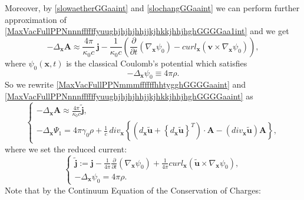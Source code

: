\documentclass{article}
\theoremstyle{definition}
\theoremstyle{remark}
\renewcommand{\vec}[1]{\mathbf{#1}}
\newcommand{\R}{\mathbb{R}}
\newcommand{\er}{\eqref}
\newcommand{\R}{{\mathbb{R}}}
\newcommand{\er}{\eqref}
\begin{document}
Moreover, by \er{slowaetherGGaaint} and \er{slochangGGaaint} we can
perform further approximation of
\er{MaxVacFullPPNnnnffffffyuughjhjhjhhjjkjhkkjhhjhghGGGGaa1int} and
we get
\begin{equation}\label{MaxVacFullPPNnnnffffffyuughjhjhjhhjjkjhkkjhhjhghGGGGaaint}
-\Delta_{\vec x}\vec A
\approx\frac{4\pi}{\kappa_0 c}\,\vec
j-\frac{1}{\kappa_0 c}\left(\frac{\partial}{\partial
t}\left(\nabla_{\vec x}\psi_0\right)-curl_{\vec x}\left(\vec
v\times\nabla_{\vec x}\psi_0\right)\right),
\end{equation}
where $\psi_0(\vec x,t)$ is the classical Coulomb's potential which
satisfies
\begin{equation}\label{columbPPNaaint}
-\Delta_{\vec x}\psi_0\equiv 4\pi\rho.
\end{equation}
So we rewrite \er{MaxVacFullPPNmmmffffffhhtygghGGGGaaint} and
\er{MaxVacFullPPNnnnffffffyuughjhjhjhhjjkjhkkjhhjhghGGGGaaint} as
\begin{equation}\label{MaxVacFull1bjkgjhjhgjgjgkjfhjfdghcgjhhjgkgkgugyyurhjfffhfjklhhhgkjgGGaaKKint}
\begin{cases}
-\Delta_{\vec x}\vec A \approx\frac{4\pi}{\kappa_0 c}\vec {\widetilde j},\\
-\Delta_{\vec x}\Psi_1=4\pi\gamma_0\rho+\frac{1}{c}\,div_{\vec x}
\left\{\left(d_{\vec x}\vec {\tilde u}+\left\{d_{\vec x}\vec {\tilde
u}\right\}^T\right)\cdot\vec A-\left(div_{\vec x}\vec {\tilde
u}\right)\vec A\right\},
\end{cases}
\end{equation}
where we set the reduced current:
\begin{equation}\label{reducedcurrentfhfhjfhjGGaaint}
\begin{cases}
\vec {\widetilde j}:=\vec j-\frac{1}{4\pi}\frac{\partial}{\partial
t} \left(\nabla_{\vec x}\psi_0\right)+\frac{1}{4\pi}curl_{\vec
x}\left(\vec {\tilde u}\times \nabla_{\vec x}\psi_0\right),\\
-\Delta_{\vec x}\psi_0= 4\pi\rho.
\end{cases}
\end{equation}
Note that by the Continuum Equation of the Conservation of Charges:
\end{document}
